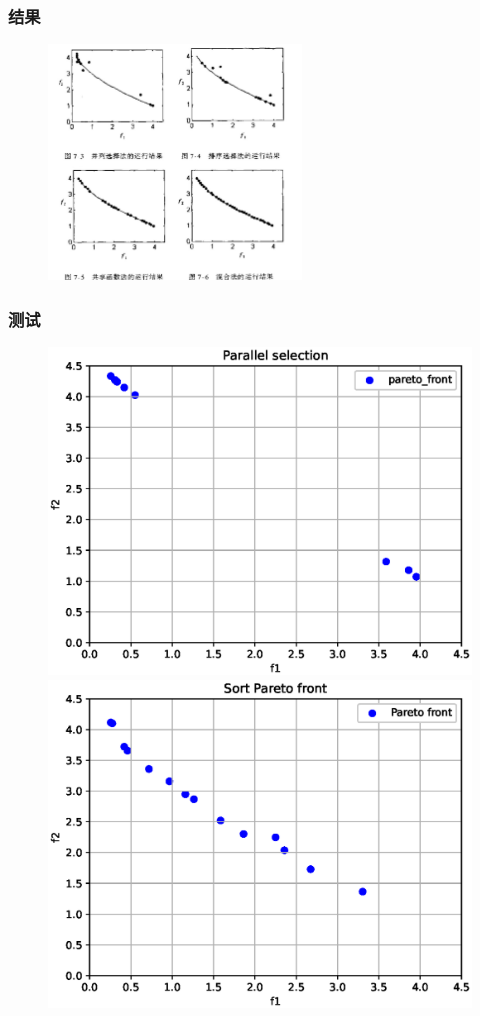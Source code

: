 \documentclass{beamer}
\begin{document}
\begin{frame}
	\frametitle{结果}
\begin{figure}[htbp]
	\centering
	\includegraphics[width=0.6\textwidth]{计算结果.jpg}
\end{figure}
\end{frame}
\begin{frame}
	\frametitle{测试}
	\begin{figure}[ht]
		\centering
		\includegraphics[scale=0.3]{parallel.eps}
		\hspace{1in}
		\includegraphics[scale=0.3]{sort.eps}
	\end{figure}
\end{frame}
		
\end{document}
